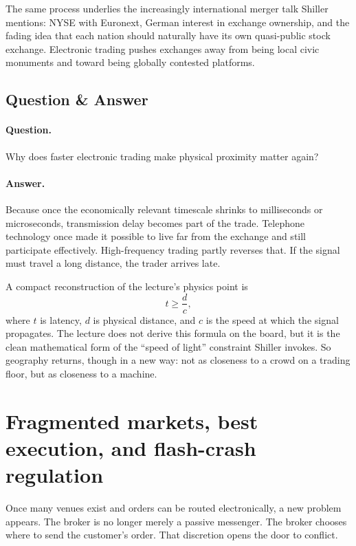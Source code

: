 The same process underlies the increasingly international merger talk Shiller mentions: NYSE with Euronext, German interest in exchange ownership, and the fading idea that each nation should naturally have its own quasi-public stock exchange. Electronic trading pushes exchanges away from being local civic monuments and toward being globally contested platforms.

\subsection{Question \& Answer}

\paragraph{Question.} Why does faster electronic trading make physical proximity matter again?

\paragraph{Answer.} Because once the economically relevant timescale shrinks to milliseconds or microseconds, transmission delay becomes part of the trade. Telephone technology once made it possible to live far from the exchange and still participate effectively. High-frequency trading partly reverses that. If the signal must travel a long distance, the trader arrives late.

A compact reconstruction of the lecture's physics point is
\begin{equation}
t \ge \frac{d}{c},
\end{equation}
where \(t\) is latency, \(d\) is physical distance, and \(c\) is the speed at which the signal propagates. The lecture does not derive this formula on the board, but it is the clean mathematical form of the ``speed of light'' constraint Shiller invokes. So geography returns, though in a new way: not as closeness to a crowd on a trading floor, but as closeness to a machine.

\section{Fragmented markets, best execution, and flash-crash regulation}

Once many venues exist and orders can be routed electronically, a new problem appears. The broker is no longer merely a passive messenger. The broker chooses where to send the customer's order. That discretion opens the door to conflict.

